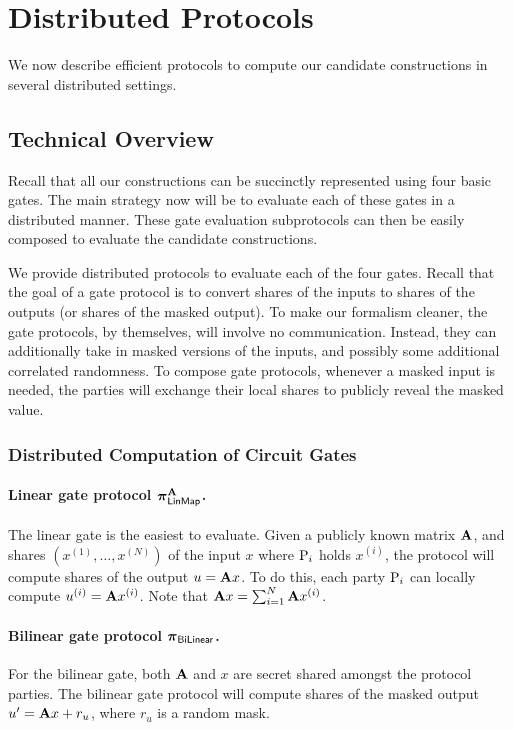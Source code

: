 \newpage
\section{Distributed Protocols}
\label{sec:distributed_protocols}

We now describe efficient protocols to compute our candidate constructions in several distributed settings.

\subsection{Technical Overview}
Recall that all our constructions can be succinctly represented using four basic gates. The main strategy now will be to evaluate each of these gates in a distributed manner. These gate evaluation subprotocols can then be easily composed to evaluate the  candidate constructions. 

We provide distributed protocols to evaluate each of the four gates. Recall that the goal of a gate protocol is to convert shares of the inputs to shares of the outputs (or shares of the masked output). To make our formalism cleaner, the gate protocols, by themselves, will involve no communication. Instead, they can additionally take in masked versions of the inputs, and possibly some additional correlated randomness. To compose gate protocols, whenever a masked input is needed, the parties will exchange their local shares to publicly reveal the masked value.

\subsubsection{Distributed Computation of Circuit Gates}

\paragraph{Linear gate protocol $\prot^\mat{A}_\LinMap$.}
The linear gate is the easiest to evaluate. Given a publicly known matrix $\mat{A}$, and shares $(x^{(1)}, \dots, x^{(N)})$ of the input $x$ where $\textnormal{P}_i$ holds $x^{(i)}$, the protocol will compute shares of the output $u = \mat{A}x$. To do this, each party $\textnormal{P}_i$ can locally compute $u^{(i)} = \mat{A}x^{(i)}$. Note that $\mat{A}x = \sum_{i=1}^N \mat{A}x^{(i)}$.

\paragraph{Bilinear gate protocol $\boldsymbol{\pi}_{\textsf{BiLinear}}$.}
For the bilinear gate, both $\mat{A}$ and $x$ are secret shared amongst the protocol parties. The bilinear gate protocol will compute shares of the masked output $u' = \mat{A}{x} + r_u$, where $r_u$ is a random mask. 

